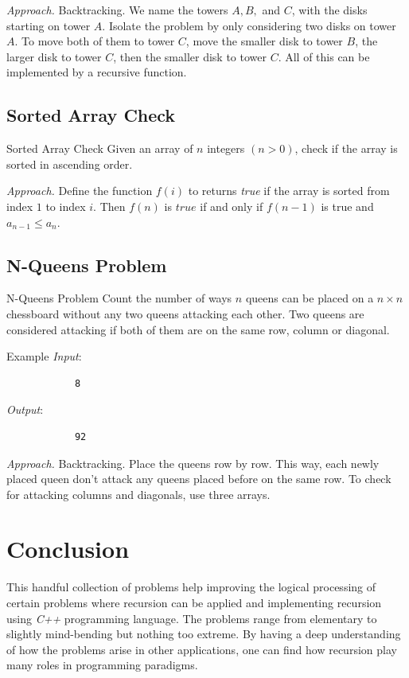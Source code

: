\documentclass{article}
\begin{document}
    \emph{Approach.} Backtracking. We name the towers $A, B,$ and $C$, with the disks starting on tower $A$. Isolate the problem by only considering two disks on tower $A$. To move both of them to tower $C$, move the smaller disk to tower $B$, the larger disk to tower $C$, then the smaller disk to tower $C$. All of this can be implemented by a recursive function.

    \subsection{Sorted Array Check}

    \begin{statement*}{Sorted Array Check}{}
        Given an array of $n$ integers $(n > 0)$, check if the array is sorted in ascending order.
    \end{statement*}

    \emph{Approach.} Define the function $f(i)$ to returns \emph{true} if the array is sorted from index $1$ to index $i$. Then $f(n)$ is $true$ if and only if $f(n - 1)$ is true and $a_{n - 1} \le a_n$.

    \subsection{N-Queens Problem}

    \begin{statement*}{N-Queens Problem}{}
        Count the number of ways $n$ queens can be placed on a $n \times n$ chessboard without any two queens attacking each other. Two queens are considered attacking if both of them are on the same row, column or diagonal.
    \end{statement*}

    \begin{example*}{Example}{}
        \emph{Input}:

        \begin{verbatim}
            8
        \end{verbatim}

        \emph{Output}:

        \begin{verbatim}
            92
        \end{verbatim}
    \end{example*}

    \emph{Approach.} Backtracking. Place the queens row by row. This way, each newly placed queen don't attack any queens placed before on the same row. To check for attacking columns and diagonals, use three arrays.

    \section{Conclusion}

    This handful collection of problems help improving the logical processing of certain problems where recursion can be applied and implementing recursion using \emph{C++} programming language. The problems range from elementary to slightly mind-bending but nothing too extreme. By having a deep understanding of how the problems arise in other applications, one can find how recursion play many roles in programming paradigms.
\end{document}
